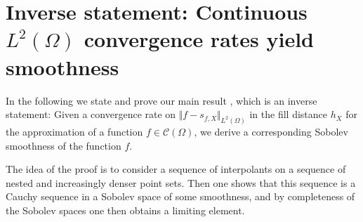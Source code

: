 \documentclass[a4paper, 10pt]{article}
\begin{document}
\section{Inverse statement: Continuous $L^2(\Omega)$ convergence rates yield smoothness} \label{sec:inverse_statement}


In the following we state and prove our main result ,
which is an inverse statement: 
Given a convergence rate on $\Vert f - s_{f, X} \Vert_{L^2(\Omega)}$ in the fill distance $h_X$ for the approximation of a function $f \in \mathcal{C}(\Omega)$,
we derive a corresponding Sobolev smoothness of the function $f$.
%
%

%
%
%
%

%
%
%

\mainresult*

%
%
%
%
%
%
%
%

%
The idea of the proof is to consider a sequence of interpolants on a sequence of nested and increasingly denser point sets.
Then one shows that this sequence is a Cauchy sequence in a Sobolev space of some smoothness,
and by completeness of the Sobolev spaces one then obtains a limiting element.
\end{document}
